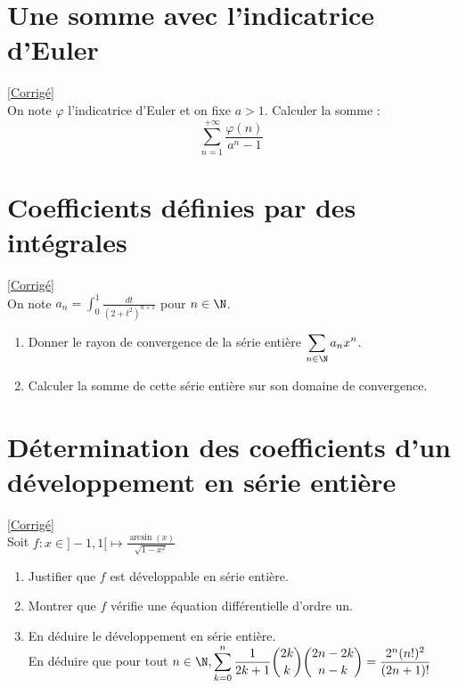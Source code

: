 \documentclass{book}
\begin{document}
\section{Une somme avec l'indicatrice d'Euler}
\label{Une somme avec l'indicatrice d'Euler}
\textcolor{blue}{\hyperref[sec:une-somme-avec-lindicatrice-deuler]{[Corrigé]}}\\
On note $\varphi$ l'indicatrice d'Euler et on fixe $a>1$. Calculer la somme :
$$\sum_{n=1}^{+\infty}\frac{\varphi(n)}{a^n-1}$$

\section{Coefficients définies par des intégrales}
\label{Coefficients définies par des intégrales}
\textcolor{blue}{\hyperref[sec:coefficients-definies-par-des-integrales]{[Corrigé]}}\\
On note $\displaystyle a_n=\int_0^1\frac{dt}{(2+t^2)^{n+1}}$ pour $n\in\N$.
\begin{enumerate}
	\item Donner le rayon de convergence de la série entière $\displaystyle\sum_{n\in \N}a_nx^n$.
	\item Calculer la somme de cette série entière sur son domaine de convergence.
\end{enumerate}

\section{Détermination des coefficients d'un développement en série entière}
\label{Détermination des coefficients d'un développement en série entière}
\textcolor{blue}{\hyperref[sec:determination-des-coefficients-dun-developpement-en-serie-entiere]{[Corrigé]}}\\
Soit $f:x\in]-1,1[\mapsto \displaystyle\frac{\arcsin(x)}{\sqrt{1-x^2}}$
\begin{enumerate}[leftmargin=*]
	\item Justifier que $f$ est développable en série entière.
	\item Montrer que $f$ vérifie une équation différentielle d'ordre un.
	\item En déduire le développement en série entière. \\En déduire que pour tout $n\in\N, \displaystyle\sum\limits_{k=0}^{n}\frac{1}{2k+1}\binom{2k}{k}\binom{2n-2k}{n-k}=\frac{2^n(n!)^2}{(2n+1)!}$
\end{enumerate}
\end{document}

